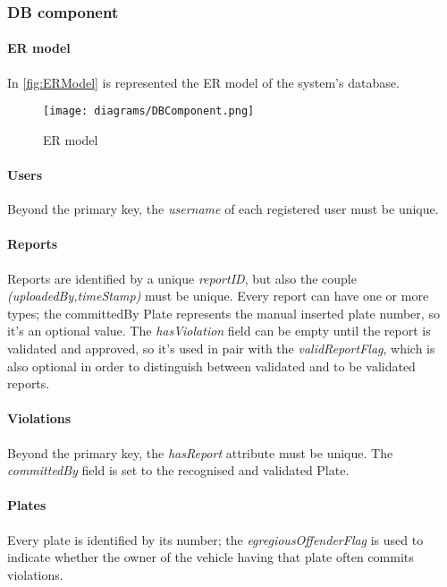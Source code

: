 \subsubsection{DB component}
\paragraph{ER model}In \autoref{fig:ERModel} is represented the ER model of the system's database.

\begin{figure}[h!]
	\hspace*{-0.7cm}
	\centering
	\texttt{[image: diagrams/DBComponent.png]}
	\caption{
		\label{fig:ERModel} 
		ER model
	}
\end{figure}

\paragraph{Users} Beyond the primary key, the \mbox{\emph{username}} of each registered user must be unique.

\paragraph{Reports}
Reports are identified by a unique \emph{reportID}, but also the couple \\ \emph{(uploadedBy,timeStamp)} must be unique. Every report can have one or more types; the committedBy Plate represents the manual inserted plate number, so it's an optional value.
The \emph{hasViolation} field can be empty until the report is validated and approved, so it's used in pair with the \emph{validReportFlag}, which is also optional in order to distinguish between validated and to be validated reports.

\paragraph{Violations}Beyond the primary key, the \mbox{\emph{hasReport}} attribute must be unique. The \mbox{\emph{committedBy}} field is set to the recognised and validated Plate.

\paragraph{Plates} Every plate is identified by its number; the \emph{egregiousOffenderFlag} is used to indicate whether the owner of the vehicle having that plate often commits violations.

